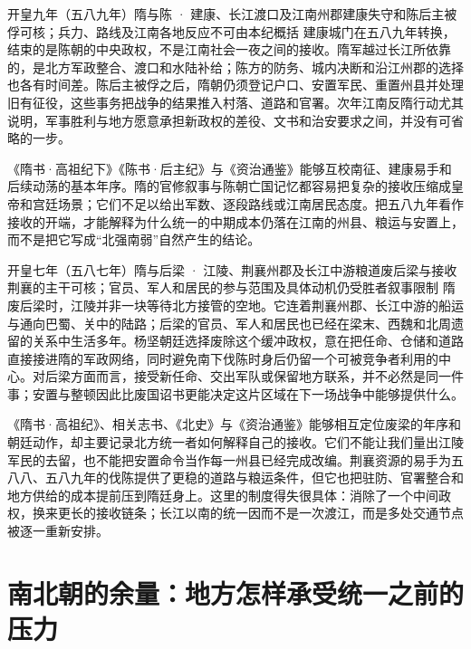 \begin{event}{}{开皇九年（五八九年）}{隋与陈 · 建康、长江渡口及江南州郡}{建康失守和陈后主被俘可核；兵力、路线及江南各地反应不可由本纪概括}
建康城门在五八九年转换，结束的是陈朝的中央政权，不是江南社会一夜之间的接收。隋军越过长江所依靠的，是北方军政整合、渡口和水陆补给；陈方的防务、城内决断和沿江州郡的选择也各有时间差。陈后主被俘之后，隋朝仍须登记户口、安置军民、重置州县并处理旧有征役，这些事务把战争的结果推入村落、道路和官署。次年江南反隋行动尤其说明，军事胜利与地方愿意承担新政权的差役、文书和治安要求之间，并没有可省略的一步。

《隋书·高祖纪下》《陈书·后主纪》与《资治通鉴》能够互校南征、建康易手和后续动荡的基本年序。隋的官修叙事与陈朝亡国记忆都容易把复杂的接收压缩成皇帝和宫廷场景；它们不足以给出军数、逐段路线或江南居民态度。把五八九年看作接收的开端，才能解释为什么统一的中期成本仍落在江南的州县、粮运与安置上，而不是把它写成“北强南弱”自然产生的结论。
\end{event}

\begin{event}{}{开皇七年（五八七年）}{隋与后梁 · 江陵、荆襄州郡及长江中游粮道}{废后梁与接收荆襄的主干可核；官员、军人和居民的参与范围及具体动机仍受胜者叙事限制}
隋废后梁时，江陵并非一块等待北方接管的空地。它连着荆襄州郡、长江中游的船运与通向巴蜀、关中的陆路；后梁的官员、军人和居民也已经在梁末、西魏和北周遗留的关系中生活多年。杨坚朝廷选择废除这个缓冲政权，意在把任命、仓储和道路直接接进隋的军政网络，同时避免南下伐陈时身后仍留一个可被竞争者利用的中心。对后梁方面而言，接受新任命、交出军队或保留地方联系，并不必然是同一件事；安置与整顿因此比废国诏书更能决定这片区域在下一场战争中能够提供什么。

《隋书·高祖纪》、相关志书、《北史》与《资治通鉴》能够相互定位废梁的年序和朝廷动作，却主要记录北方统一者如何解释自己的接收。它们不能让我们量出江陵军民的去留，也不能把安置命令当作每一州县已经完成改编。荆襄资源的易手为五八八、五八九年的伐陈提供了更稳的道路与粮运条件，但它也把驻防、官署整合和地方供给的成本提前压到隋廷身上。这里的制度得失很具体：消除了一个中间政权，换来更长的接收链条；长江以南的统一因而不是一次渡江，而是多处交通节点被逐一重新安排。
\end{event}

\section{南北朝的余量：地方怎样承受统一之前的压力}

